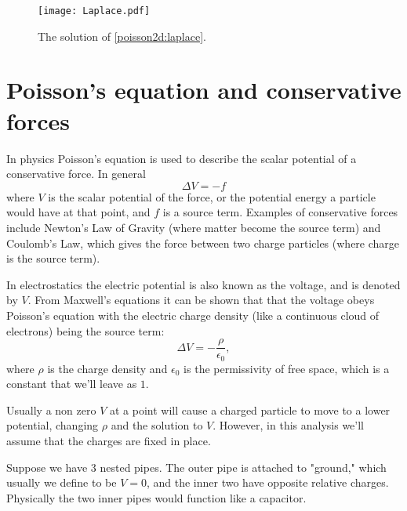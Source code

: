 \begin{figure}
\texttt{[image: Laplace.pdf]}
\caption{The solution of \eqref{poisson2d:laplace}.}
\end{figure}

\section*{Poisson's equation and conservative forces}
In physics Poisson's equation is used to describe the scalar potential of a conservative force.
In general
\[ \Delta V = - f\]
where $V$ is the scalar potential of the force, or the potential energy a particle would have at that point, and $f$ is a source term.
Examples of conservative forces include Newton's Law of Gravity (where matter become the source term) and Coulomb's Law, which gives the force between two charge particles (where charge is the source term).

In electrostatics the electric potential is also known as the voltage, and is denoted by $V.$ 
From Maxwell's equations it can be shown that that the voltage obeys Poisson's equation with the electric charge density (like a continuous cloud of electrons) being the source term: 
\[
 \Delta V = -\frac{\rho}{\epsilon_0},
\]
where $\rho$ is the charge density and $\epsilon_0$ is the permissivity of 
free space, which is a constant that we'll leave as $1$.

Usually a non zero $V$ at a point will cause a charged particle to move to a lower potential, changing $\rho$ and the solution to $V$.
However, in this analysis we'll assume that the charges are fixed in place.

Suppose we have 3 nested pipes.
The outer pipe is attached to "ground," which usually we define to be $V=0$, and the inner two have opposite relative charges.
Physically the two inner pipes would function like a capacitor.

